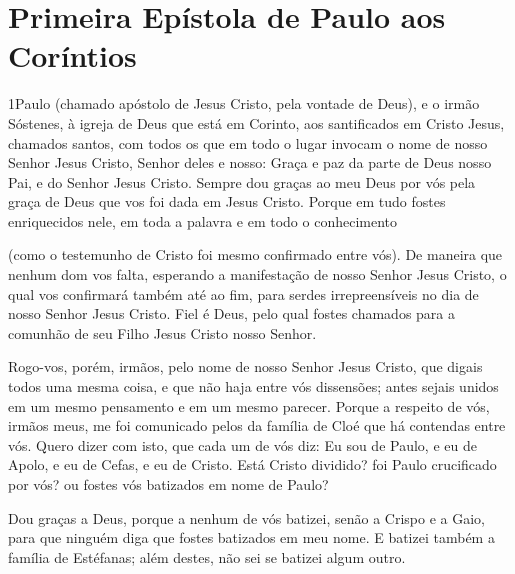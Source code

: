 \thispagestyle{empty}
\chapter*{Primeira Epístola de Paulo aos Coríntios}

\lettrine{1} Paulo (chamado apóstolo de Jesus Cristo, pela
vontade de Deus), e o irmão Sóstenes, à igreja de Deus que está
em Corinto, aos santificados em Cristo Jesus, chamados santos, com
todos os que em todo o lugar invocam o nome de nosso Senhor Jesus
Cristo, Senhor deles e nosso: Graça e paz da parte de Deus nosso
Pai, e do Senhor Jesus Cristo. Sempre dou graças ao meu Deus por
vós pela graça de Deus que vos foi dada em Jesus Cristo. Porque
em tudo fostes enriquecidos nele, em toda a palavra e em todo o
conhecimento

 (como o testemunho de Cristo foi mesmo confirmado entre vós).
De maneira que nenhum dom vos falta, esperando a manifestação de
nosso Senhor Jesus Cristo, o qual vos confirmará também até ao
fim, para serdes irrepreensíveis no dia de nosso Senhor Jesus
Cristo. Fiel é Deus, pelo qual fostes chamados para a comunhão
de seu Filho Jesus Cristo nosso Senhor.

Rogo-vos, porém, irmãos, pelo nome de nosso Senhor Jesus Cristo,
que digais todos uma mesma coisa, e que não haja entre vós
dissensões; antes sejais unidos em um mesmo pensamento e em um mesmo
parecer. Porque a respeito de vós, irmãos meus, me foi
comunicado pelos da família de Cloé que há contendas entre vós.
Quero dizer com isto, que cada um de vós diz: Eu sou de
Paulo, e eu de Apolo, e eu de Cefas, e eu de Cristo. Está
Cristo dividido? foi Paulo crucificado por vós? ou fostes vós
batizados em nome de Paulo?

Dou graças a Deus, porque a nenhum de vós batizei, senão a Crispo
e a Gaio, para que ninguém diga que fostes batizados em meu
nome. E batizei também a família de Estéfanas; além destes,
não sei se batizei algum outro.

